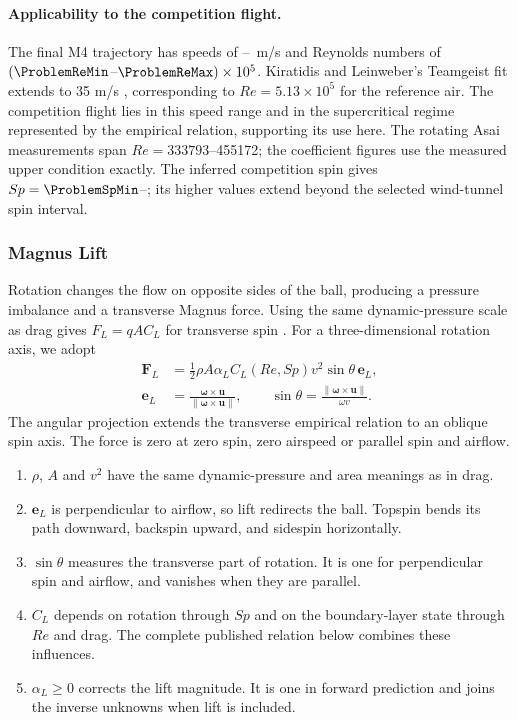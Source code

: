 \documentclass[12pt,letterpaper]{article}
\begin{document}
\paragraph{Applicability to the competition flight.}
The final M4 trajectory has speeds of \ProblemSpeedMin--\ProblemSpeedMax\ m/s and Reynolds numbers of $(\ProblemReMin$--$\ProblemReMax)\times10^5$. Kiratidis and Leinweber's Teamgeist fit extends to 35 m/s \cite{kiratidis2018}, corresponding to $Re=5.13\times10^5$ for the reference air. The competition flight lies in this speed range and in the supercritical regime represented by the empirical relation, supporting its use here. The rotating Asai measurements span $Re=333793$--455172; the coefficient figures use the measured upper condition exactly. The inferred competition spin gives $Sp=\ProblemSpMin$--\ProblemSpMax; its higher values extend beyond the selected wind-tunnel spin interval.

\subsubsection{Magnus Lift}\label{sec:lift}
Rotation changes the flow on opposite sides of the ball, producing a pressure imbalance and a transverse Magnus force. Using the same dynamic-pressure scale as drag gives $F_L=qAC_L$ for transverse spin \cite{goff2009,kiratidis2018}. For a three-dimensional rotation axis, we adopt
\begin{equation}
\begin{aligned}
\boldsymbol F_L&=\tfrac12\rho A\alpha_L C_L(Re,Sp)v^2\sin\theta\,\boldsymbol e_L,\\
\boldsymbol e_L&=\frac{\boldsymbol\omega\times\boldsymbol u}{\|\boldsymbol\omega\times\boldsymbol u\|},\qquad
\sin\theta=\frac{\|\boldsymbol\omega\times\boldsymbol u\|}{\omega v}.
\end{aligned}\label{eq:lift-force}
\end{equation}
The angular projection extends the transverse empirical relation to an oblique spin axis. The force is zero at zero spin, zero airspeed or parallel spin and airflow.
\begin{enumerate}
\item $\rho$, $A$ and $v^2$ have the same dynamic-pressure and area meanings as in drag.
\item $\boldsymbol e_L$ is perpendicular to airflow, so lift redirects the ball. Topspin bends its path downward, backspin upward, and sidespin horizontally.
\item $\sin\theta$ measures the transverse part of rotation. It is one for perpendicular spin and airflow, and vanishes when they are parallel.
\item $C_L$ depends on rotation through $Sp$ and on the boundary-layer state through $Re$ and drag. The complete published relation below combines these influences.
\item $\alpha_L\geq0$ corrects the lift magnitude. It is one in forward prediction and joins the inverse unknowns when lift is included.
\end{enumerate}
\end{document}
